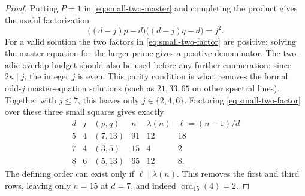 \documentclass[11pt]{article}
\newcommand{\ord}{\operatorname{ord}}
\begin{document}
\begin{proof}
Putting $P=1$ in \eqref{eq:small-two-master} and completing the product
gives the useful factorization
\begin{equation}
\bigl((d-j)p-d\bigr)
\bigl((d-j)q-d\bigr)=j^2.
\tag{S4}\label{eq:small-two-factor}
\end{equation}
For a valid solution the two factors in \eqref{eq:small-two-factor} are positive: solving the master equation for the larger prime gives a positive denominator.  The two-adic overlap budget should also be used before any further enumeration: since $2\kappa\mid j$, the integer $j$ is even.  This parity condition is what removes the formal odd-$j$ master-equation solutions (such as $21,33,65$ on other spectral lines).  Together with
$j\le7$, this leaves only $j\in\{2,4,6\}$.  Factoring
\eqref{eq:small-two-factor} over these three small squares gives exactly
\[
\begin{array}{c|c|c|c|c|c}
 d&j&(p,q)&n&\lambda(n)&\ell=(n-1)/d\\ \hline
5&4&(7,13)&91&12&18\\
7&4&(3,5)&15&4&2\\
8&6&(5,13)&65&12&8.
\end{array}
\]
The defining order can exist only if $\ell\mid\lambda(n)$.  This removes
the first and third rows, leaving only $n=15$ at $d=7$, and indeed
$\ord_{15}(4)=2$.


\end{proof}
\end{document}
